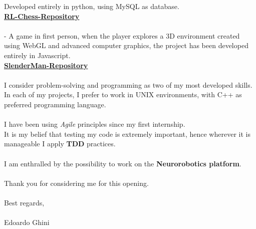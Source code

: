 \documentclass[9pt]{developercv} %
\begin{document}
Developed entirely in python, using MySQL as database.\\
\href{https://github.com/dinies/ArtificialIntelligence/tree/master/RLproject}{\textbf{RL-Chess-Repository}}\\
\\
- A game in first person, when the player explores a 3D environment created using WebGL and advanced computer graphics, the project has been developed entirely in Javascript.\\
\href{https://github.com/dinies/InteractiveGraphics/tree/master/final-project/slander}{\textbf{SlenderMan-Repository}}\\
\\
I consider problem-solving and programming as two of my most developed skills.\\
In each of my projects, I prefer to work in UNIX environments, with C++ as preferred programming language.\\
\\
I have been using \textit{Agile} principles since my first internship.\\
It is my belief that testing my code is extremely important, hence wherever it is manageable I apply \textbf{TDD} practices.\\
\\
I am enthralled by the possibility to work on the \textbf{Neurorobotics platform}.\\
\\


Thank you for considering me for this opening.\\
\\
Best regards,\\
\\
Edoardo Ghini
\end{document}
